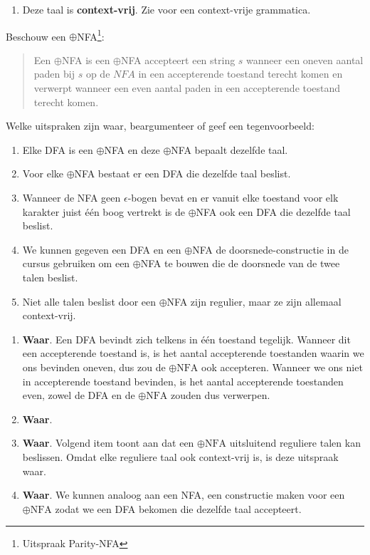 \documentclass{article}
\begin{document}
\begin{question}
\begin{answer}
\begin{enumerate}
 \item Deze taal is \textbf{context-vrij}. Zie  voor een context-vrije grammatica.
\end{enumerate}

\end{answer}
\end{question}

\begin{question}
Beschouw een $\oplus$NFA\footnote{Uitspraak Parity-NFA}:
\begin{quote}
\begin{definition}
Een $\oplus$NFA is een $\oplus$NFA accepteert een string $s$ wanneer een oneven aantal paden bij $s$ op de $NFA$ in een accepterende toestand terecht komen en verwerpt wanneer een even aantal paden in een accepterende toestand terecht komen.
\end{definition}
\end{quote}
Welke uitspraken zijn waar, beargumenteer of geef een tegenvoorbeeld:
\begin{enumerate}
 \item Elke DFA is een $\oplus$NFA en deze $\oplus$NFA bepaalt dezelfde taal.
 \item Voor elke $\oplus$NFA bestaat er een DFA die dezelfde taal beslist.
 \item Wanneer de NFA geen $\epsilon$-bogen bevat en er vanuit elke toestand voor elk karakter juist \'e\'en boog vertrekt is de $\oplus$NFA ook een DFA die dezelfde taal beslist.
 \item We kunnen gegeven een DFA en een $\oplus$NFA de doorsnede-constructie in de cursus gebruiken om een $\oplus$NFA te bouwen die de doorsnede van de twee talen beslist.
 \item Niet alle talen beslist door een $\oplus$NFA zijn regulier, maar ze zijn allemaal context-vrij.
\end{enumerate}
\begin{answer}
\begin{enumerate}
 \item \textbf{Waar}. Een DFA bevindt zich telkens in \'e\'en toestand tegelijk. Wanneer dit een accepterende toestand is, is het aantal accepterende toestanden waarin we ons bevinden oneven, dus zou de $\oplus\mbox{NFA}$ ook accepteren. Wanneer we ons niet in accepterende toestand bevinden, is het aantal accepterende toestanden even, zowel de DFA en de $\oplus\mbox{NFA}$ zouden dus verwerpen.
 \item \textbf{Waar}.
 \item \textbf{Waar}. Volgend item toont aan dat een $\oplus\mbox{NFA}$ uitsluitend reguliere talen kan beslissen. Omdat elke reguliere taal ook context-vrij is, is deze uitspraak waar.
 \item \textbf{Waar}. We kunnen analoog aan een NFA, een constructie maken voor een $\oplus\mbox{NFA}$ zodat we een DFA bekomen die dezelfde taal accepteert.
 \begin{quote}
  

\end{quote}
\end{enumerate}
\end{answer}
\end{question}
\end{document}
